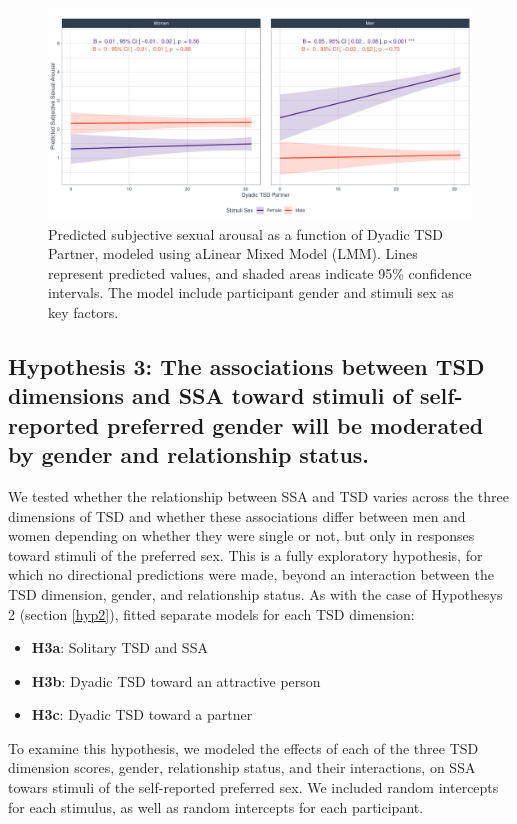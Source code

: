\documentclass[
  bookmarksnumbered]{article}
\providecommand{\tightlist}{%
  \setlength{\itemsep}{0pt}\setlength{\parskip}{0pt}}
\begin{document}
\begin{figure}
\centering
\includegraphics{Sexual_Desire_Arousal_files/figure-latex/fig-h2c-1.pdf}
\caption{\label{fig:fig-h2c}Predicted subjective sexual arousal as a function of Dyadic TSD Partner, modeled using aLinear Mixed Model (LMM). Lines represent predicted values, and shaded areas indicate 95\% confidence intervals. The model include participant gender and stimuli sex as key factors.}
\end{figure}

\subsection{Hypothesis 3: The associations between TSD dimensions and SSA toward stimuli of self-reported preferred gender will be moderated by gender and relationship status.}\label{hyp3}

We tested whether the relationship between SSA and TSD varies across the three dimensions of TSD and whether these associations differ between men and women depending on whether they were single or not, but only in responses toward stimuli of the preferred sex. This is a fully exploratory hypothesis, for which no directional predictions were made, beyond an interaction between the TSD dimension, gender, and relationship status. As with the case of Hypothesys 2 (section \ref{hyp2}), fitted separate models for each TSD dimension:

\begin{itemize}
\tightlist
\item
  \textbf{H3a}: Solitary TSD and SSA
\item
  \textbf{H3b}: Dyadic TSD toward an attractive person
\item
  \textbf{H3c}: Dyadic TSD toward a partner
\end{itemize}

To examine this hypothesis, we modeled the effects of each of the three TSD dimension scores, gender, relationship status, and their interactions, on SSA towars stimuli of the self-reported preferred sex. We included random intercepts for each stimulus, as well as random intercepts for each participant.
\end{document}
